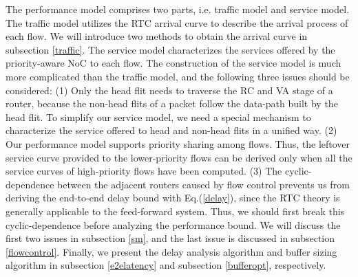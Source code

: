 \documentclass[preprint]{elsarticle}
\begin{document}
The performance model comprises two parts, i.e. traffic model and service model. The traffic model utilizes the RTC arrival curve to describe the arrival process of each flow. We will introduce two methods to obtain the arrival curve in subsection \ref{traffic}. The service model characterizes the services offered by the priority-aware NoC to each flow. The construction of the service model is much more complicated than the traffic model, and the following three issues should be considered: (1) Only the head flit needs to traverse the RC and VA stage of a router, because the non-head flits of a packet follow the data-path built by the head flit. To simplify our service model, we need a special mechanism to characterize the service offered to head and non-head flits in a unified way. (2) Our performance model supports priority sharing among flows. Thus, the leftover service curve provided to the lower-priority flows can be derived only when all the service curves of high-priority flows have been computed. (3) The cyclic-dependence between the adjacent routers caused by flow control prevents us from deriving the end-to-end delay bound with Eq.(\ref{delay}), since the RTC theory is generally applicable to the feed-forward system. Thus, we should first break this cyclic-dependence before analyzing the performance bound. We will discuss the first two issues in subsection \ref{sm}, and the last issue is discussed in subsection \ref{flowcontrol}. Finally, we present the delay analysis algorithm and buffer sizing algorithm in subsection \ref{e2elatency} and subsection \ref{bufferopt}, respectively.
\end{document}
